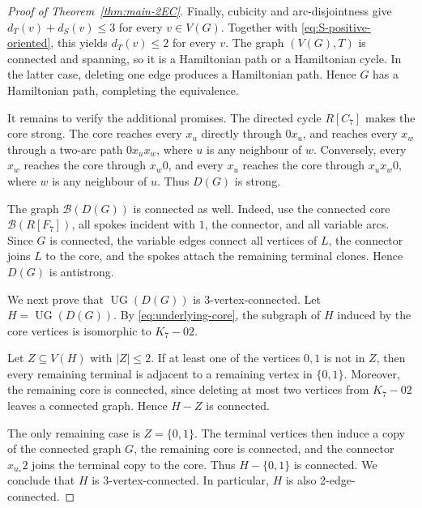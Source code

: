 \documentclass[10pt,a4paper]{amsart}
\newcommand{\UG}{\operatorname{UG}}
\newcommand{\cB}{\mathcal{B}}
\begin{document}
\begin{proof}[Proof of Theorem~\ref{thm:main-2EC}]
Finally, cubicity and arc-disjointness give $d_T(v)+d_S(v)\le 3$ for every $v\in V(G)$.
Together with \eqref{eq:S-positive-oriented}, this yields $d_T(v)\le 2$ for every $v$. The graph $(V(G),T)$ is connected and spanning, so it is a Hamiltonian path or a Hamiltonian cycle.
In the latter case, deleting one edge produces a Hamiltonian path. Hence $G$ has a Hamiltonian path, completing the equivalence.

It remains to verify the additional promises. The directed cycle $R[C_7]$ makes the core strong. The core reaches every $x_u$ directly through $0x_u$, and reaches every $x_w$ through a two-arc
path $0x_ux_w$, where $u$ is any neighbour of $w$.  Conversely, every $x_w$ reaches the core through $x_w0$, and every $x_u$ reaches the core through
$x_ux_w0$, where $w$ is any neighbour of $u$. Thus $D(G)$ is strong.

The graph $\cB(D(G))$ is connected as well. Indeed, use the connected core $\cB(R[F_7])$, all spokes incident with $1$, the connector, and all variable arcs. Since $G$ is connected, the variable edges connect all vertices of $L$, the connector joins $L$ to the core, and the spokes attach the remaining terminal clones. Hence $D(G)$ is antistrong.

We next prove that $\UG(D(G))$ is 3-vertex-connected. Let $H=\UG(D(G))$.
By \eqref{eq:underlying-core}, the subgraph of $H$ induced by the core vertices is isomorphic to $K_7-02$.

Let $Z\subseteq V(H)$ with $|Z|\le 2$. If at least one of the vertices $0,1$ is not in $Z$, then every remaining terminal is adjacent to a remaining vertex in $\{0,1\}$. Moreover, the remaining core is connected, since deleting at most two vertices from $K_7-02$ leaves a connected graph. Hence $H-Z$ is connected.

The only remaining case is
$Z=\{0,1\}$. The terminal vertices then induce a copy of the connected graph $G$, the remaining core is connected, and the connector
$x_{u_*}2$ joins the terminal copy to the core. Thus $H-\{0,1\}$ is connected. We conclude that $H$ is 3-vertex-connected. In particular, $H$ is also 2-edge-connected.


\end{proof}
\end{document}

